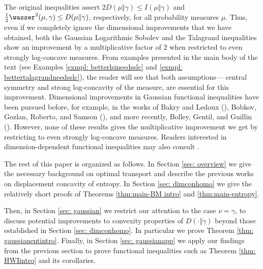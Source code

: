 The original inequalities assert $2D (\mu \Vert \gamma) \leq I(\mu \Vert \gamma)$ and $\frac{1}{2} \wasser^{2}(\mu, \gamma) \leq D(\mu \Vert \gamma)$, respectively, for all probability measures $\mu$. Thus, even if we completely ignore the dimensional improvements that we have obtained, both the Gaussian Logarithmic Sobolev and the Talagrand inequalities show an improvement by a multiplicative factor of $2$ when restricted to even strongly log-concave measures. From examples presented in the main body of the text (see Examples \ref{exmpl: betterlsineedsslc} and \ref{exmpl: bettertalagrandneedsslc}), the reader will see that both assumptions--- central symmetry and strong log-concavity of the measure, are essential for this improvement. Dimensional improvements in Gaussian functional inequalities have been pursued before, for example, in the works of Bakry and Ledoux (\cite{BakryLedoux06}), Bobkov, Gozlan, Roberto, and Samson (\cite{BobkovGozlanRobertoSamson14}), and more recently, Bolley, Gentil, and Guillin (\cite{BolleyGentilGuillin18}). However, none of these results gives the multiplicative improvement we get by restricting to even strongly log-concave measures. Readers interested in dimension-dependent functional inequalities may also consult \cite{BakryBolleyGentil12, BakryBolleyGentil17, EskenazisShenfeld24, Shenfeld24}. 

The rest of this paper is organized as follows. In Section \ref{sec: overview} we
give the necessary background on optimal transport and describe
the previous works on displacement concavity of entropy. In Section
\ref{sec: dimconhomo} we give the relatively short proofs of Theorems \ref{thm:main-BM intro} and \ref{thm:main-entropy}.

Then, in Section \ref{sec: gaussian} we restrict our attention to the case $\nu=\gamma$, to discuss potential improvements to convexity properties of $D(\cdot \Vert \gamma)$ beyond those established in Section \ref{sec: dimconhomo}. In particular we prove Theorem \ref{thm: gaussianentintro}. Finally, in Section \ref{sec: gaussianapp} we apply our findings from the previous section to prove functional inequalities such as Theorem \ref{thm: HWIintro} and its corollaries. 

